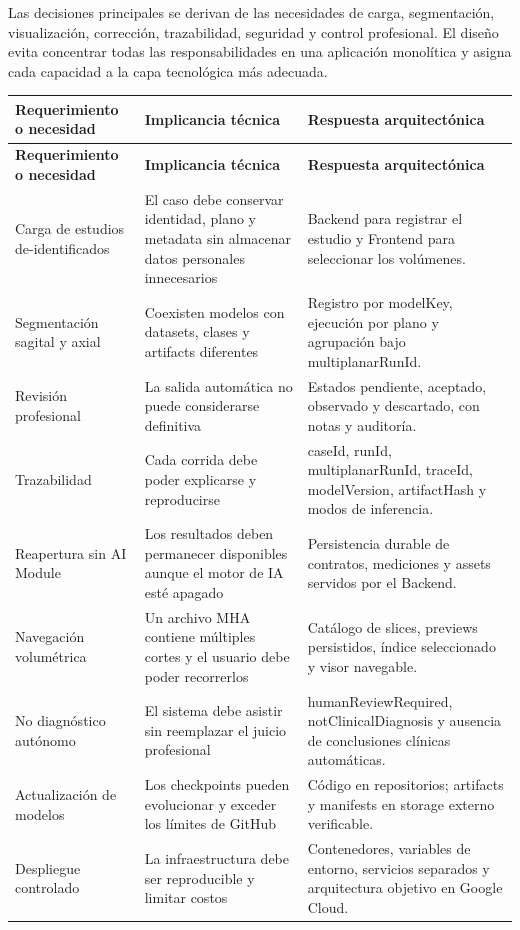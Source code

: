 Las decisiones principales se derivan de las necesidades de carga, segmentación, visualización, corrección, trazabilidad, seguridad y control profesional. El diseño evita concentrar todas las responsabilidades en una aplicación monolítica y asigna cada capacidad a la capa tecnológica más adecuada.

{\footnotesize
\setlength{\LTleft}{0pt}
\setlength{\LTright}{0pt}
\setlength{\tabcolsep}{2pt}
\renewcommand{\arraystretch}{1.18}
\label{tab:arch-decisiones-requerimientos}
\begin{longtable}{>{\raggedright\arraybackslash}p{} >{\raggedright\arraybackslash}p{} >{\raggedright\arraybackslash}p{}}
\hline
\textbf{Requerimiento o necesidad} & \textbf{Implicancia técnica} & \textbf{Respuesta arquitectónica} \\
\hline
\endfirsthead
\hline
\textbf{Requerimiento o necesidad} & \textbf{Implicancia técnica} & \textbf{Respuesta arquitectónica} \\
\hline
\endhead
\hline
\endfoot
Carga de estudios de-identificados & El caso debe conservar identidad, plano y metadata sin almacenar datos personales innecesarios & Backend para registrar el estudio y Frontend para seleccionar los volúmenes. \\
Segmentación sagital y axial & Coexisten modelos con datasets, clases y artifacts diferentes & Registro por modelKey, ejecución por plano y agrupación bajo multiplanarRunId. \\
Revisión profesional & La salida automática no puede considerarse definitiva & Estados pendiente, aceptado, observado y descartado, con notas y auditoría. \\
Trazabilidad & Cada corrida debe poder explicarse y reproducirse & caseId, runId, multiplanarRunId, traceId, modelVersion, artifactHash y modos de inferencia. \\
Reapertura sin AI Module & Los resultados deben permanecer disponibles aunque el motor de IA esté apagado & Persistencia durable de contratos, mediciones y assets servidos por el Backend. \\
Navegación volumétrica & Un archivo MHA contiene múltiples cortes y el usuario debe poder recorrerlos & Catálogo de slices, previews persistidos, índice seleccionado y visor navegable. \\
No diagnóstico autónomo & El sistema debe asistir sin reemplazar el juicio profesional & humanReviewRequired, notClinicalDiagnosis y ausencia de conclusiones clínicas automáticas. \\
Actualización de modelos & Los checkpoints pueden evolucionar y exceder los límites de GitHub & Código en repositorios; artifacts y manifests en storage externo verificable. \\
Despliegue controlado & La infraestructura debe ser reproducible y limitar costos & Contenedores, variables de entorno, servicios separados y arquitectura objetivo en Google Cloud. \\
\hline
\end{longtable}
}

